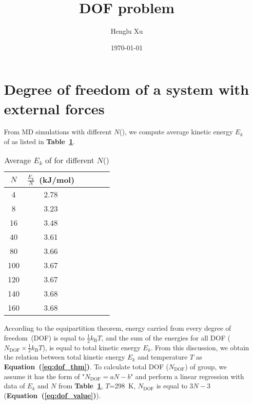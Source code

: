 \documentclass{article}
\title{DOF problem}
\author{Henglu Xu}
\date{\today}
\newcommand{\reftab}[1]{\textbf{Table~\ref{#1}}}
\newcommand{\refeq}[1]{\textbf{Equation~(\ref{#1})}}
\begin{document}
\section{Degree of freedom of a system with external forces}

From MD simulations with different $N$(),
we compute average kinetic energy $E_k$ of  as listed in \reftab{tab:Ek_nCH4}.

\begin{table}[htbp]
    \centering
    \caption{Average $E_k$ of  for different $N$()}
    \label{tab:Ek_nCH4}
    \begin{tabular}{ccclcl}
    \toprule
    $N$%
    & $\frac{E_k}{N}$~(kJ/mol)\\
    \midrule
     4  & 2.78 \\   %
     8  & 3.23 \\   %
    16  & 3.48 \\   %
    40  & 3.61 \\   %
    80  & 3.66 \\   %
    100 & 3.67 \\   %
    120 & 3.67 \\   %
    140 & 3.68 \\   %
    160 & 3.68 \\   %
    \bottomrule
    \end{tabular}
\end{table}

According to the equipartition theorem,
energy carried from every degree of freedom~(DOF) is equal to $\frac{1}{2}k_\text{B} T$,
and the sum of the energies for all DOF ($N_\text{DOF}\times \frac{1}{2}k_\text{B} T$), is equal to total kinetic energy $E_k$.
From this discussion, we obtain the relation between total kinetic energy $E_k$ and temperature $T$ as \refeq{eq:dof_thm}.
To calculate total DOF ($N_\text{DOF}$) of  group, we assume it has the form of "$N_\text{DOF}=aN-b$" and perform a linear regression with data of $E_k$ and $N$ from \reftab{tab:Ek_nCH4}, $T$=298~K,
$N_\text{DOF}$ is equal to $3N-3$ (\refeq{eq:dof_value}).
\end{document}
